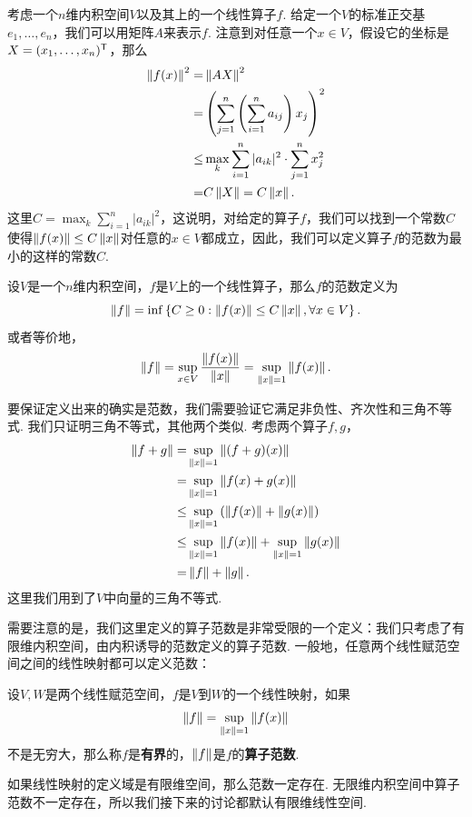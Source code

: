考虑一个$n$维内积空间$V$以及其上的一个线性算子$f$. 给定一个$V$的标准正交基$e_1,\dots,e_n$，我们可以用矩阵$A$来表示$f$. 注意到对任意一个$x\in V$，假设它的坐标是$X=(x_1,\dots,x_n)^{\mathsf{T}}$，那么
\begin{align*}
    \left\|f(x)\right\|^2=&\left\|AX\right\|^2\\
    =&\left(\sum_{j=1}^n\left(\sum_{i=1}^na_{ij}\right)x_j\right)^2\\
    \leq &\max_{k}\sum_{i=1}^n|a_{ik}|^2\cdot\sum_{j=1}^n x_j^2\\
    =&C\left\|X\right\|=C\left\|x\right\|.
\end{align*}
这里$C=\max_{k}\sum_{i=1}^n|a_{ik}|^2$，这说明，对给定的算子$f$，我们可以找到一个常数$C$使得$\left\|f(x)\right\|\leq C\left\|x\right\|$对任意的$x\in V$都成立，因此，我们可以定义算子$f$的范数为最小的这样的常数$C$. 

\begin{definition}[算子范数]
    设$V$是一个$n$维内积空间，$f$是$V$上的一个线性算子，那么$f$的范数定义为
    \[\left\|f\right\|=\inf\left\{C\geq 0:\left\|f(x)\right\|\leq C\left\|x\right\|,\forall x\in V\right\}.\]
或者等价地，
\[\left\|f\right\|=\sup_{x\in V}\frac{\left\|f(x)\right\|}{\left\|x\right\|}=\sup_{\left\|x\right\|=1}\left\|f(x)\right\|.\]
\end{definition}

要保证定义出来的确实是范数，我们需要验证它满足非负性、齐次性和三角不等式. 我们只证明三角不等式，其他两个类似. 考虑两个算子$f,g$，
\begin{align*}
    \left\|f+g\right\|=&\sup_{\left\|x\right\|=1}\left\|(f+g)(x)\right\|\\
    =&\sup_{\left\|x\right\|=1}\left\|f(x)+g(x)\right\|\\
    \leq&\sup_{\left\|x\right\|=1}\left(\left\|f(x)\right\|+\left\|g(x)\right\|\right)\\
    \leq&\sup_{\left\|x\right\|=1}\left\|f(x)\right\|+\sup_{\left\|x\right\|=1}\left\|g(x)\right\|\\
    =&\left\|f\right\|+\left\|g\right\|.
\end{align*}
这里我们用到了$V$中向量的三角不等式. 

需要注意的是，我们这里定义的算子范数是非常受限的一个定义：我们只考虑了有限维内积空间，由内积诱导的范数定义的算子范数. 一般地，任意两个线性赋范空间之间的线性映射都可以定义范数：

\begin{definition}[线性映射的范数]
    设$V,W$是两个线性赋范空间，$f$是$V$到$W$的一个线性映射，如果
    \[\left\|f\right\|=\sup_{\left\|x\right\|=1}\left\|f(x)\right\|\]
    不是无穷大，那么称$f$是\textbf{有界}的，$\left\|f\right\|$是$f$的\textbf{算子范数}. 
\end{definition}

如果线性映射的定义域是有限维空间，那么范数一定存在. 无限维内积空间中算子范数不一定存在，所以我们接下来的讨论都默认有限维线性空间. 

